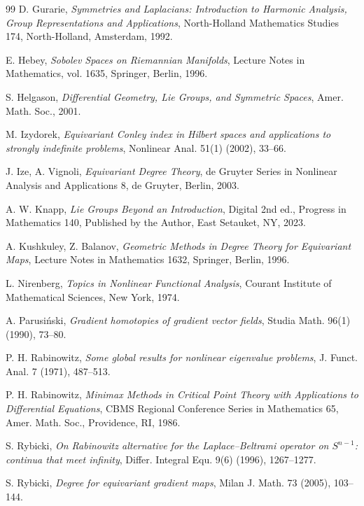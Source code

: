 \documentclass[reqno,twoside,12pt]{amsart}
\numberwithin{equation}{section} \errorcontextlines=0
\begin{document}
\begin{thebibliography}{99}
 D. Gurarie, \emph{Symmetries and Laplacians: Introduction to Harmonic Analysis, Group Representations and Applications}, North-Holland Mathematics Studies 174, North-Holland, Amsterdam, 1992.

 E. Hebey, \emph{Sobolev Spaces on Riemannian Manifolds}, Lecture Notes in Mathematics, vol. 1635, Springer, Berlin, 1996.

 S. Helgason, \emph{Differential Geometry, Lie Groups, and Symmetric Spaces}, Amer. Math. Soc., 2001.

 M. Izydorek, \emph{Equivariant Conley index in Hilbert spaces and applications to strongly indefinite problems}, Nonlinear Anal. 51(1) (2002), 33--66.

 J. Ize, A. Vignoli, \emph{Equivariant Degree Theory}, de Gruyter Series in Nonlinear Analysis and Applications 8, de Gruyter, Berlin, 2003.

 A. W. Knapp, \emph{Lie Groups Beyond an Introduction}, Digital 2nd ed., Progress in Mathematics 140, Published by the Author, East Setauket, NY, 2023.

 A. Kushkuley, Z. Balanov, \emph{Geometric Methods in Degree Theory for Equivariant Maps}, Lecture Notes in Mathematics 1632, Springer, Berlin, 1996.

 L. Nirenberg, \emph{Topics in Nonlinear Functional Analysis}, Courant Institute of Mathematical Sciences, New York, 1974.

 A. Parusiński, \emph{Gradient homotopies of gradient vector fields}, Studia Math. 96(1) (1990), 73--80.

 P. H. Rabinowitz, \emph{Some global results for nonlinear eigenvalue problems}, J. Funct. Anal. 7 (1971), 487--513.

 P. H. Rabinowitz, \emph{Minimax Methods in Critical Point Theory with Applications to Differential Equations}, CBMS Regional Conference Series in Mathematics 65, Amer. Math. Soc., Providence, RI, 1986.

 S. Rybicki, \emph{On Rabinowitz alternative for the Laplace--Beltrami operator on $S^{n-1}$: continua that meet infinity}, Differ. Integral Equ. 9(6) (1996), 1267--1277.

 S. Rybicki, \emph{Degree for equivariant gradient maps}, Milan J. Math. 73 (2005), 103--144.


\end{thebibliography}
\end{document}
